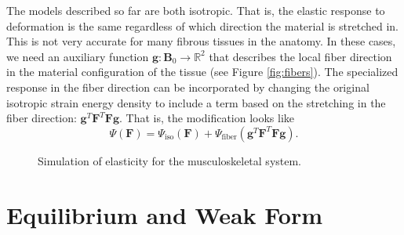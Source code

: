 The models described so far are both isotropic. That is, the elastic response to deformation is the same regardless of which direction the material is stretched in. This is not very accurate for many fibrous tissues in the anatomy. In these cases, we need an auxiliary function $\mathbf{g} \colon \mathbf{B}_0 \to \mathbb{R}^2$ that describes the local fiber direction in the material configuration of the tissue (see Figure \ref{fig:fibers}). The specialized response in the fiber direction can be incorporated by changing the original isotropic strain energy density to include a term based on the stretching in the fiber direction: $\mathbf{g}^T \mathbf{F}^T \mathbf{F} \mathbf{g}$. That is, the modification looks like
\begin{equation*}
\Psi \left( \mathbf{F} \right) = \Psi_{\text{iso}} \left( \mathbf{F} \right) + \Psi_{\text{fiber}} \left( \mathbf{g}^T \mathbf{F}^T \mathbf{F} \mathbf{g} \right).
\end{equation*}

\begin{figure}
\caption{Simulation of elasticity for the musculoskeletal system.}
\end{figure}

\section*{Equilibrium and Weak Form}

